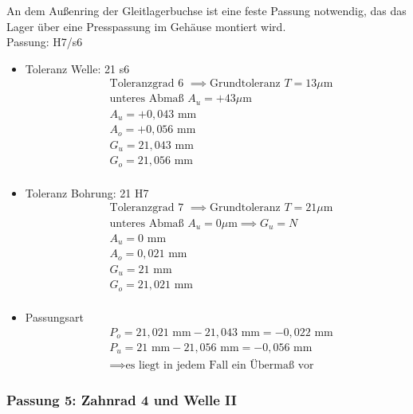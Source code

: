 An dem Außenring der Gleitlagerbuchse ist eine feste Passung notwendig, das das Lager über eine Presspassung im Gehäuse montiert wird. \\ 
Passung: H7/s6
\begin{itemize}
	\item Toleranz Welle: 21 s6
	\begin{align*}
	&\text{Toleranzgrad 6 } \implies \text{Grundtoleranz } T=13 \mu\text{m} \\
	&\text{unteres Abmaß } A_u = +43\mu\text{m} \\
	&A_u = +0,043 \text{ mm} \\
	&A_o = +0,056 \text{ mm} \\
	&G_u = 21,043 \text{ mm} \\
	&G_o = 21,056 \text{ mm}\\
	\end{align*} 
	\item Toleranz Bohrung: 21 H7
	\begin{align*}
	&\text{Toleranzgrad 7 } \implies \text{Grundtoleranz } T=21 \mu\text{m} \\
	&\text{unteres Abmaß } A_u = 0 \mu\text{m} \implies G_u = N\\
	&A_u = 0 \text{ mm} \\
	&A_o = 0,021 \text{ mm} \\
	&G_u = 21 \text{ mm} \\
	&G_o = 21,021 \text{ mm}\\
	\end{align*} 
	\item Passungsart
	\begin{align*}
	&P_o = 21,021 \text{ mm} - 21,043 \text{ mm} = -0,022 \text{ mm} \\
	&P_u = 21 \text{ mm} - 21,056 \text{ mm} = -0,056 \text{ mm}\\
	&\implies \text{es liegt in jedem Fall ein Übermaß vor}
	\end{align*} 
\end{itemize}
\newpage

\subsubsection{Passung 5: Zahnrad 4 und Welle II}

